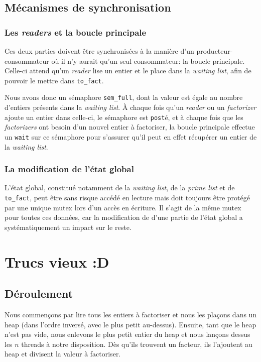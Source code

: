 \documentclass[a4paper,10pt]{article}
\begin{document}
\subsection*{Mécanismes de synchronisation}

\subsubsection*{Les \emph{readers} et la boucle principale}

Ces deux parties doivent être synchronisées à la manière d'un producteur-consommateur où il n'y aurait qu'un seul consommateur: la boucle principale. Celle-ci attend qu'un \emph{reader} lise un entier et le place dans la \emph{waiting list}, afin de pouvoir le mettre dans \texttt{to\_fact}.

Nous avons donc un sémaphore \texttt{sem\_full}, dont la valeur est égale au nombre d'entiers présents dans la \emph{waiting list}. À chaque fois qu'un \emph{reader} ou un \emph{factorizer} ajoute un entier dans celle-ci, le sémaphore est \texttt{post}é, et à chaque fois que les \emph{factorizers} ont besoin d'un nouvel entier à factoriser, la boucle principale effectue un \texttt{wait} sur ce sémaphore pour s'assurer qu'il peut en effet récupérer un entier de la \emph{waiting list}.

\subsubsection*{La modification de l'état global}

L'état global, constitué notamment de la \emph{waiting list}, de la \emph{prime list} et de \texttt{to\_fact}, peut être sans risque accédé en lecture mais doit toujours être protégé par une unique mutex lors d'un accès en écriture. Il s'agit de la même mutex pour toutes ces données, car la modification de d'une partie de l'état global a systématiquement un impact sur le reste. 


\newpage
\section*{Trucs vieux :D}

\subsection*{Déroulement}

Nous commençons par lire tous les entiers à factoriser et nous les plaçons dans un heap (dans l'ordre inversé, avec le plus petit au-dessus). Ensuite, tant que le heap n'est pas vide, nous enlevons le plus petit entier du heap et nous lançons dessus les $n$ threads à notre disposition. Dès qu'ils trouvent un facteur, ils l'ajoutent au heap et divisent la valeur à factoriser.
\end{document}
